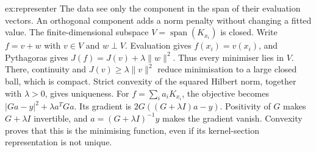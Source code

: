 \begin{solution}{ex:representer}
\idea The data see only the component in the span of their evaluation vectors. An orthogonal component adds a norm penalty without changing a fitted value.
\writeup The finite-dimensional subspace $V=\operatorname{span}(K_{x_i})$ is closed. Write $f=v+w$ with $v\in V$ and $w\perp V$. Evaluation gives $f(x_i)=v(x_i)$, and Pythagoras gives $J(f)=J(v)+\lambda\|w\|^2$. Thus every minimiser lies in $V$. There, continuity and $J(v)\ge\lambda\|v\|^2$ reduce minimisation to a large closed ball, which is compact. Strict convexity of the squared Hilbert norm, together with $\lambda>0$, gives uniqueness. For $f=\sum_ia_iK_{x_i}$, the objective becomes $|Ga-y|^2+\lambda a^TGa$. Its gradient is $2G((G+\lambda I)a-y)$. Positivity of $G$ makes $G+\lambda I$ invertible, and $a=(G+\lambda I)^{-1}y$ makes the gradient vanish. Convexity proves that this is the minimising function, even if its kernel-section representation is not unique.
\end{solution}

